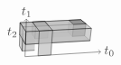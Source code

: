 \documentclass[orivec]{llncs} \usepackage[T1]{fontenc}
\begin{document}
\[\begin{tikzpicture}[line join=round,opacity=0.7]
\filldraw[fill=lightgray,draw=none](1.068,-.283)--(.716,-.302)--(.705,-.631)--(1.052,-.61)--cycle;
\draw(.716,-.302)--(.705,-.631)--(1.052,-.61);
\filldraw[fill=lightgray](.799,-.446)--(2.586,-.342)--(2.298,-.08)--(.639,-.169)--cycle;
\filldraw[fill=gray](2.1,-.225)--(2.132,.107)--(2.002,.224)--(1.973,-.098)--cycle;
\filldraw[fill=lightgray](.705,-.631)--(.727,.037)--(.649,.158)--(.63,-.487)--cycle;
\filldraw[fill=lightgray,draw=none](1.416,-.263)--(1.437,.072)--(1.333,.192)--(1.314,-.133)--cycle;
\draw(1.437,.072)--(1.333,.192)--(1.314,-.133);
\filldraw[fill=gray](.978,-.151)--(1.314,-.133)--(1.333,.192)--(.993,.175)--cycle;
\filldraw[fill=gray](1.416,-.263)--(1.437,.072)--(1.333,.192)--(1.314,-.133)--cycle;
\filldraw[fill=gray](1.068,-.283)--(1.416,-.263)--(1.314,-.133)--(.978,-.151)--cycle;
\filldraw[fill=lightgray,draw=none](1.068,-.283)--(1.084,.055)--(.993,.175)--(.978,-.151)--cycle;
\draw(1.084,.055)--(.993,.175)--(.978,-.151);
\filldraw[fill=gray](1.068,-.283)--(1.084,.055)--(.993,.175)--(.978,-.151)--cycle;
\filldraw[fill=lightgray](.727,.037)--(2.473,.125)--(2.331,.24)--(.649,.158)--cycle;
\filldraw[fill=lightgray,draw=none](.716,-.302)--(2.436,-.206)--(2.473,.125)--(.727,.037)--cycle;
\draw(2.436,-.206)--(2.473,.125)--(.727,.037)--(.716,-.302);
\filldraw[fill=gray](2.1,-.225)--(2.436,-.206)--(2.473,.125)--(2.132,.107)--cycle;
\filldraw[fill=lightgray,draw=none](1.416,-.263)--(1.526,-.404)--(1.55,-.057)--(1.437,.072)--cycle;
\draw(1.526,-.404)--(1.55,-.057)--(1.437,.072);
\filldraw[fill=gray](1.068,-.283)--(1.416,-.263)--(1.437,.072)--(1.084,.055)--cycle;
\filldraw[fill=lightgray,draw=none](1.068,-.283)--(1.165,-.425)--(1.183,-.076)--(1.084,.055)--cycle;
\draw(1.165,-.425)--(1.183,-.076)--(1.084,.055);
\filldraw[fill=lightgray](.812,-.095)--(2.626,0)--(2.331,.24)--(.649,.158)--cycle;
\filldraw[fill=gray](2.132,.107)--(2.473,.125)--(2.331,.24)--(2.002,.224)--cycle;
\filldraw[fill=lightgray](.799,-.446)--(.812,-.095)--(.649,.158)--(.639,-.169)--cycle;
\filldraw[fill=gray](1.084,.055)--(1.437,.072)--(1.333,.192)--(.993,.175)--cycle;
\filldraw[fill=lightgray](1.183,-.076)--(1.55,-.057)--(1.333,.192)--(.993,.175)--cycle;
\draw[arrows=->](.786,-.786)--(2.887,-.652);
\filldraw[fill=lightgray](.799,-.446)--(2.586,-.342)--(2.626,0)--(.812,-.095)--cycle;
\filldraw[fill=lightgray](1.147,-.763)--(1.503,-.741)--(1.55,-.057)--(1.183,-.076)--cycle;
\draw[arrows=-](.786,-.786)--(.799,-.446);
\draw[arrows=-](.799,-.446)--(.812,-.095);
\draw[arrows=->](.812,-.095)--(.825,.267);
\draw (3.123,-.637) node {$t_0$};\draw (.832,.452) node {$t_1$};\draw (.435,-.115) node {$t_2$};\end{tikzpicture} \]
\end{document}
